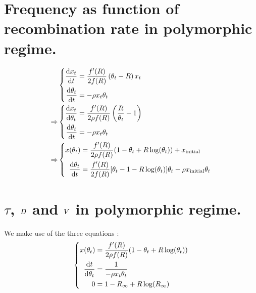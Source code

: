 \documentclass{article}
\begin{document}
\section*{Frequency as function of recombination rate in polymorphic regime.}

\begin{align} 
& \left\{
      \begin{aligned}
          \dfrac{\mathrm{d} x_{t}}{\mathrm{d} t} &= \dfrac{f'(R )}{2 f(R )} \left( \theta_{t}  - R \right) x_{t} \\
        \dfrac{\mathrm{d} \theta_{t}}{\mathrm{d} t} &= 
        - \rho x_{t} \theta_{t} \\
      \end{aligned}
\right. \\
 \Rightarrow
 & \left\{
      \begin{aligned}
          \dfrac{\mathrm{d} x_{t}}{\mathrm{d} \theta_{t} } &= \dfrac{f'(R )}{2 \rho f(R )}\left( \dfrac{R }{\theta_{t} } -1 \right) \\
        \dfrac{\mathrm{d} \theta_{t} }{\mathrm{d} t} &= 
        - \rho x_{t} \theta_{t} \\
      \end{aligned}
    \right. \\
 \Rightarrow
  & \left\{
      \begin{aligned}
         x(\theta_{t} ) &=\dfrac{f'(R)}{2 \rho f(R )} (1- \theta_{t}  + R  \operatorname{log}(\theta_{t} )) + x_{\mathrm{initial}}  \\
        \dfrac{\mathrm{d} \theta_{t} }{\mathrm{d} t} &= 
         \dfrac{f'(R )}{2 f(R )} [ \theta_{t} -1- R  \operatorname{log}(\theta_{t} )]\theta_{t}   - \rho x_{\mathrm{initial}} \theta_{t} \\
      \end{aligned}
    \right.
\end{align}

\section*{$\tau$, $D$ and $V$ in polymorphic regime.}
We make use of the three equations :  
\begin{equation}
\left\{
  \begin{aligned}
         x(\theta_{t} ) &= \dfrac{f'(R)}{2 \rho f(R )} (1- \theta_{t}  + R  \operatorname{log}(\theta_{t} )) \\
         \dfrac{\mathrm{d} t }{\mathrm{d} \theta_{t}} &= \dfrac{1}{-\rho x_{t} \theta_{t}} \\
        0 &= 1-{R_{\infty}}  + R  \operatorname{log}({R_{\infty}} )  \\
  \end{aligned}
   \right.
\end{equation}
\end{document}
